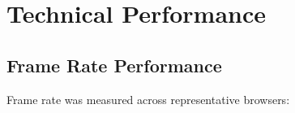 
\section{Technical Performance}
\label{sec:technical-performance}

\subsection{Frame Rate Performance}
\label{subsec:framerate}

Frame rate was measured across representative browsers:

